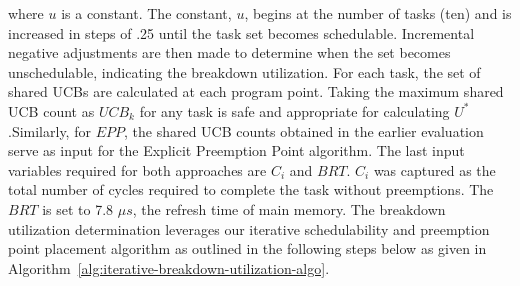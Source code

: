 where ${u}$ is a constant. The constant, ${u}$, begins at the number
of tasks (ten) and is increased in steps of .25 until the task set
becomes schedulable. Incremental negative adjustments are then made to
determine when the set becomes unschedulable, indicating the breakdown
utilization.
%
For each task, the set of shared UCBs are calculated at each program
point. Taking the maximum shared UCB count as ${UCB_k}$ for any task
is safe and appropriate for calculating ${U^*}$.Similarly, for ${EPP}$,
the shared UCB counts obtained in the earlier evaluation serve as input for
the Explicit Preemption Point algorithm.  The last input variables required
for both approaches are ${C_i}$ and ${BRT}$. ${C_i}$ was captured as the
total number of cycles required to complete the task without preemptions.
The ${BRT}$ is set to 7.8 ${{\mu}s}$, the refresh time of main memory.
%
The breakdown utilization determination leverages our iterative schedulability
and preemption point placement algorithm as outlined in the following steps below
as given in Algorithm~\ref{alg:iterative-breakdown-utilization-algo}.
